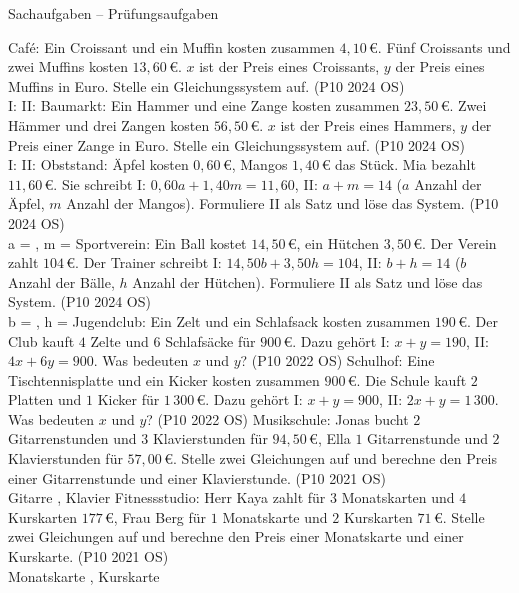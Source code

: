 \begin{aufgabe}{Sachaufgaben – Prüfungsaufgaben}
\begin{teile}
\teil Café: Ein Croissant und ein Muffin kosten zusammen $4{,}10\,€$. Fünf Croissants und zwei Muffins kosten $13{,}60\,€$. $x$ ist der Preis eines Croissants, $y$ der Preis eines Muffins in Euro. Stelle ein Gleichungssystem auf. \hfill (P10 2024 OS) \\ I: \leerfeld \quad II: \leerfeld
\teil Baumarkt: Ein Hammer und eine Zange kosten zusammen $23{,}50\,€$. Zwei Hämmer und drei Zangen kosten $56{,}50\,€$. $x$ ist der Preis eines Hammers, $y$ der Preis einer Zange in Euro. Stelle ein Gleichungssystem auf. \hfill (P10 2024 OS) \\ I: \leerfeld \quad II: \leerfeld
\steil Obststand: Äpfel kosten $0{,}60\,€$, Mangos $1{,}40\,€$ das Stück. Mia bezahlt $11{,}60\,€$. Sie schreibt I: $0{,}60a + 1{,}40m = 11{,}60$, II: $a + m = 14$ ($a$ Anzahl der Äpfel, $m$ Anzahl der Mangos). Formuliere II als Satz und löse das System. \hfill (P10 2024 OS) \\ a = \leerfeld , m = \leerfeld
\steil Sportverein: Ein Ball kostet $14{,}50\,€$, ein Hütchen $3{,}50\,€$. Der Verein zahlt $104\,€$. Der Trainer schreibt I: $14{,}50b + 3{,}50h = 104$, II: $b + h = 14$ ($b$ Anzahl der Bälle, $h$ Anzahl der Hütchen). Formuliere II als Satz und löse das System. \hfill (P10 2024 OS) \\ b = \leerfeld , h = \leerfeld
\teil Jugendclub: Ein Zelt und ein Schlafsack kosten zusammen $190\,€$. Der Club kauft $4$ Zelte und $6$ Schlafsäcke für $900\,€$. Dazu gehört I: $x + y = 190$, II: $4x + 6y = 900$. Was bedeuten $x$ und $y$? \hfill (P10 2022 OS)
\teil Schulhof: Eine Tischtennisplatte und ein Kicker kosten zusammen $900\,€$. Die Schule kauft $2$ Platten und $1$ Kicker für $1\,300\,€$. Dazu gehört I: $x + y = 900$, II: $2x + y = 1\,300$. Was bedeuten $x$ und $y$? \hfill (P10 2022 OS)
\teil Musikschule: Jonas bucht $2$ Gitarrenstunden und $3$ Klavierstunden für $94{,}50\,€$, Ella $1$ Gitarrenstunde und $2$ Klavierstunden für $57{,}00\,€$. Stelle zwei Gleichungen auf und berechne den Preis einer Gitarrenstunde und einer Klavierstunde. \hfill (P10 2021 OS) \\ Gitarre \leerfeld[€] , Klavier \leerfeld[€]
\teil Fitnessstudio: Herr Kaya zahlt für $3$ Monatskarten und $4$ Kurskarten $177\,€$, Frau Berg für $1$ Monatskarte und $2$ Kurskarten $71\,€$. Stelle zwei Gleichungen auf und berechne den Preis einer Monatskarte und einer Kurskarte. \hfill (P10 2021 OS) \\ Monatskarte \leerfeld[€] , Kurskarte \leerfeld[€]
\end{teile}
\end{aufgabe}
